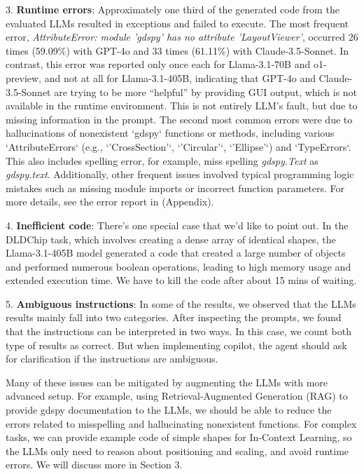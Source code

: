 \documentclass{article}
\begin{document}
  3. \textbf{Runtime errors}: Approximately one third of the generated code from the evaluated LLMs resulted in exceptions and failed to execute. The most frequent error, \textit{AttributeError: module 'gdspy' has no attribute 'LayoutViewer'}, occurred 26 times (59.09\%) with GPT-4o and 33 times (61.11\%) with Claude-3.5-Sonnet. In contrast, this error was reported only once each for Llama-3.1-70B and o1-preview, and not at all for Llama-3.1-405B, indicating that GPT-4o and Claude-3.5-Sonnet are trying to be more ``helpful'' by providing GUI output, which is not available in the runtime environment. This is not entirely LLM's fault, but due to missing information in the prompt. The second most common errors were due to hallucinations of nonexistent `gdspy` functions or methods, including various `AttributeErrors` (e.g., `'CrossSection'`, `'Circular'`, `'Ellipse'`) and `TypeErrors`. This also includes spelling error, for example, miss spelling \textit{gdspy.Text} as \textit{gdspy.text}. Additionally, other frequent issues involved typical programming logic mistakes such as missing module imports or incorrect function parameters. For more details, see the error report in (Appendix).
  
  4. \textbf{Inefficient code}: There's one special case that we'd like to point out. In the DLDChip task, which involves creating a dense array of identical shapes, the Llama-3.1-405B model generated a code that created a large number of objects and performed numerous boolean operations, leading to high memory usage and extended execution time. We have to kill the code after about 15 mins of waiting. 

  5. \textbf{Ambiguous instructions}: In some of the results, we observed that the LLMs results mainly fall into two categories. After inspecting the prompts, we found that the instructions can be interpreted in two ways. In this case, we count both type of results as correct. But when implementing copilot, the agent should ask for clarification if the instructions are ambiguous.

Many of these issues can be mitigated by augmenting the LLMs with more advanced setup. For example, using Retrieval-Augmented Generation (RAG) to provide gdspy documentation to the LLMs, we should be able to reduce the errors related to misspelling and hallucinating nonexistent functions. For complex tasks, we can provide example code of simple shapes for In-Context Learning, so the LLMs only need to reason about positioning and scaling, and avoid runtime errors. We will discuss more in Section 3.
\end{document}
